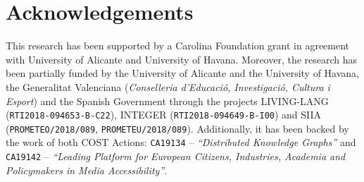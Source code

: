 \documentclass[a4paper,11pt,twocolumn,twoside]{article}
\begin{document}

\section*{Acknowledgements}
This research has been supported by a Carolina Foundation grant in agreement with University of Alicante and University of Havana. Moreover, the research has been partially funded by the University of Alicante and the University of Havana, the Generalitat Valenciana (\textit{Conselleria d’Educació, Investigació, Cultura i Esport}) and the Spanish Government through the projects LIVING-LANG (\texttt{RTI2018-094653-B-C22}), INTEGER (\texttt{RTI2018-094649-B-I00})  and SIIA (\texttt{PROMETEO/2018/089}, \texttt{PROMETEU/2018/089}). Additionally, it has been backed by the work of both COST Actions: \texttt{CA19134} -- \textit{``Distributed Knowledge Graphs''} and \texttt{CA19142} -- \textit{``Leading Platform for European Citizens, Industries, Academia and Policymakers in Media Accessibility''}.



\end{document}
